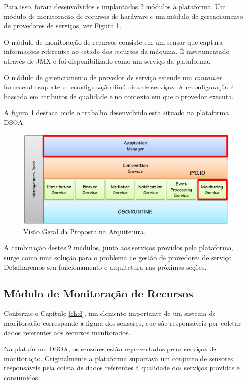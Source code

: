Para isso, foram desenvolvidos e implantados 2 módulos à plataforma. Um módulo de monitoração de recursos de hardware e um módulo de gerenciamento de provedores de serviços, ver Figura \ref{fig:proposal}.

O módulo de monitoração de recursos consiste em um sensor que captura informações referentes ao estado dos recursos da máquina. É instrumentado através de JMX e foi disponibilizado como um serviço da plataforma. 

O módulo de gerenciamento de provedor de serviço estende um \textit{container} fornecendo suporte a reconfiguração dinâmica de serviços. A reconfiguração é baseada em atributos de qualidade e no contexto em que o provedor executa.

A figura \ref{fig:proposal} destaca onde o trabalho desenvolvido esta situado na plataforma DSOA.

\begin{figure}[htp]
\centering
\includegraphics[width=13cm]{chapters/chapter4/dsoa-provider-manager.png}
\caption[Visão Geral da Proposta na Arquitetura]{Visão Geral da Proposta na Arquitetura.}
\label{fig:proposal}
\end{figure}

A combinação destes 2 módulos, junto aos serviços providos pela plataforma, surge como uma solução para o problema de gestão de provedores de serviço. Detalharemos seu funcionamento e arquitetura nas próximas seções.


\subsection{Módulo de Monitoração de Recursos}

Conforme o Capítulo \ref{ch:3}, um elemento importante de um sistema de monitoração corresponde a figura dos sensores, que são responsáveis por coletar dados referentes aos recursos monitorados.

Na plataforma DSOA, os sensores estão representados pelos serviços de monitoração. Originalmente a plataforma suportava um conjunto de sensores responsáveis pela coleta de dados referentes à qualidade dos serviços providos e consumidos.

